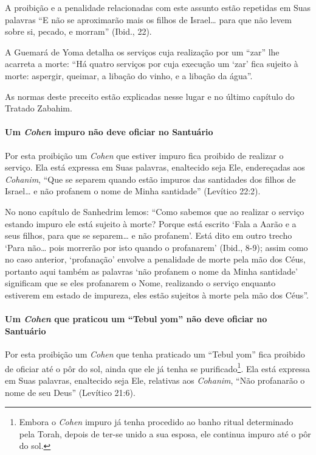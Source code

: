 A proibição e a penalidade relacionadas com este assunto estão repetidas
em Suas palavras ``E não se aproximarão mais os filhos de Israel\ldots{} para
que não levem sobre si, pecado, e morram'' (Ibid., 22).

A Guemará de Yoma detalha os serviços cuja realização por um ``zar'' lhe
acarreta a morte: ``Há quatro serviços por cuja execução um `zar' fica
sujeito à morte: aspergir, queimar, a libação do vinho, e a libação da
água''.

As normas deste preceito estão explicadas nesse lugar e no último
capítulo do Tratado Zabahim.


\paragraph{Um \textit{Cohen} impuro não deve oficiar no Santuário}

Por esta proibição um \textit{Cohen} que estiver impuro fica proibido de
realizar o serviço. Ela está expressa em Suas palavras, enaltecido seja
Ele, endereçadas aos \textit{Cohanim}, ``Que se separem quando estão impuros
das santidades dos filhos de Israel\ldots{} e não profanem o nome de Minha
santidade'' (Levítico 22:2).

No nono capítulo de Sanhedrim lemos: ``Como sabemos que ao realizar o
serviço estando impuro ele está sujeito à morte? Porque está escrito
`Fala a Aarão e a seus filhos, para que se separem\ldots{} e não profanem'.
Está dito em outro trecho `Para não\ldots{} pois morrerão por isto quando o
profanarem' (Ibid., 8-9); assim como no caso anterior, `profanação'
envolve a penalidade de morte pela mão dos Céus, portanto aqui também as
palavras `não profanem o nome da Minha santidade' significam que se eles
profanarem o Nome, realizando o serviço enquanto estiverem em estado de
impureza, eles estão sujeitos à morte pela mão dos Céus''.

\paragraph{Um \textit{Cohen} que praticou um ``Tebul yom'' não deve oficiar no
Santuário}

Por esta proibição um \textit{Cohen} que tenha praticado um ``Tebul yom''
fica proibido de oficiar até o pôr do sol, ainda que ele já tenha se
purificado\footnote{Embora o \textit{Cohen} impuro já tenha procedido ao banho ritual
determinado pela Torah, depois de ter-se unido a sua esposa, ele
continua impuro até o pôr do sol.}. Ela está expressa em Suas palavras,
enaltecido seja Ele, relativas aos \textit{Cohanim}, ``Não profanarão o nome
de seu Deus'' (Levítico 21:6).

